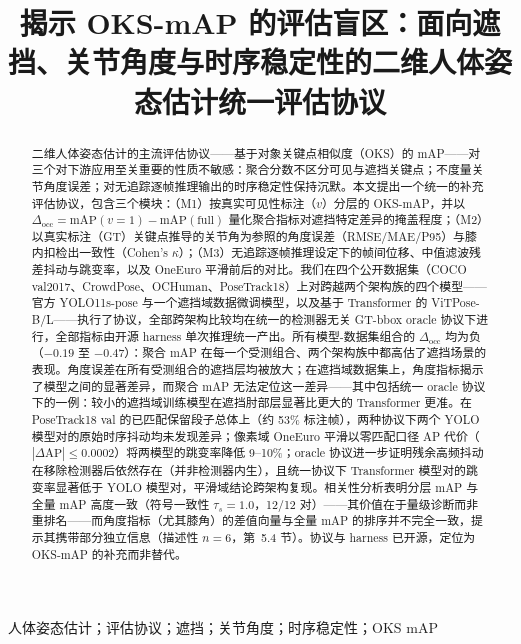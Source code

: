 \documentclass[10pt,conference]{IEEEtran}
\begin{document}
\title{揭示 OKS-mAP 的评估盲区：面向遮挡、关节角度与时序稳定性的二维人体姿态估计统一评估协议}

\author{
}

\maketitle

\begin{abstract}
二维人体姿态估计的主流评估协议——基于对象关键点相似度（OKS）的 mAP——对三个对下游应用至关重要的性质不敏感：聚合分数不区分可见与遮挡关键点；不度量关节角度误差；对无追踪逐帧推理输出的时序稳定性保持沉默。本文提出一个统一的补充评估协议，包含三个模块：（M1）按真实可见性标注（$v$）分层的 OKS-mAP，并以 $\Delta_{\mathrm{occ}}=\mathrm{mAP}(v{=}1)-\mathrm{mAP}(\mathrm{full})$ 量化聚合指标对遮挡特定差异的掩盖程度；（M2）以真实标注（GT）关键点推导的关节角为参照的角度误差（RMSE/MAE/P95）与膝内扣检出一致性（Cohen's $\kappa$）；（M3）无追踪逐帧推理设定下的帧间位移、中值滤波残差抖动与跳变率，以及 OneEuro 平滑前后的对比。我们在四个公开数据集（COCO val2017、CrowdPose、OCHuman、PoseTrack18）上对跨越两个架构族的四个模型——官方 YOLO11s-pose 与一个遮挡域数据微调模型，以及基于 Transformer 的 ViTPose-B/L——执行了协议，全部跨架构比较均在统一的检测器无关 GT-bbox oracle 协议下进行，全部指标由开源 harness 单次推理统一产出。所有模型-数据集组合的 $\Delta_{\mathrm{occ}}$ 均为负（$-0.19$ 至 $-0.47$）：聚合 mAP 在每一个受测组合、两个架构族中都高估了遮挡场景的表现。角度误差在所有受测组合的遮挡层均被放大；在遮挡域数据集上，角度指标揭示了模型之间的显著差异，而聚合 mAP 无法定位这一差异——其中包括统一 oracle 协议下的一例：较小的遮挡域训练模型在遮挡肘部层显著比更大的 Transformer 更准。在 PoseTrack18 val 的已匹配保留段子总体上（约 53\% 标注帧），两种协议下两个 YOLO 模型对的原始时序抖动均未发现差异；像素域 OneEuro 平滑以零匹配口径 AP 代价（$|\Delta\mathrm{AP}|\le 0.0002$）将两模型的跳变率降低 9--10\%；oracle 协议进一步证明残余高频抖动在移除检测器后依然存在（并非检测器内生），且统一协议下 Transformer 模型对的跳变率显著低于 YOLO 模型对，平滑域结论跨架构复现。相关性分析表明分层 mAP 与全量 mAP 高度一致（符号一致性 $\tau_s=1.0$，12/12 对）——其价值在于量级诊断而非重排名——而角度指标（尤其膝角）的差值向量与全量 mAP 的排序并不完全一致，提示其携带部分独立信息（描述性 $n=6$，第~5.4 节）。协议与 harness 已开源，定位为 OKS-mAP 的补充而非替代。
\end{abstract}

\begin{IEEEkeywords}
人体姿态估计；评估协议；遮挡；关节角度；时序稳定性；OKS mAP
\end{IEEEkeywords}
\end{document}
